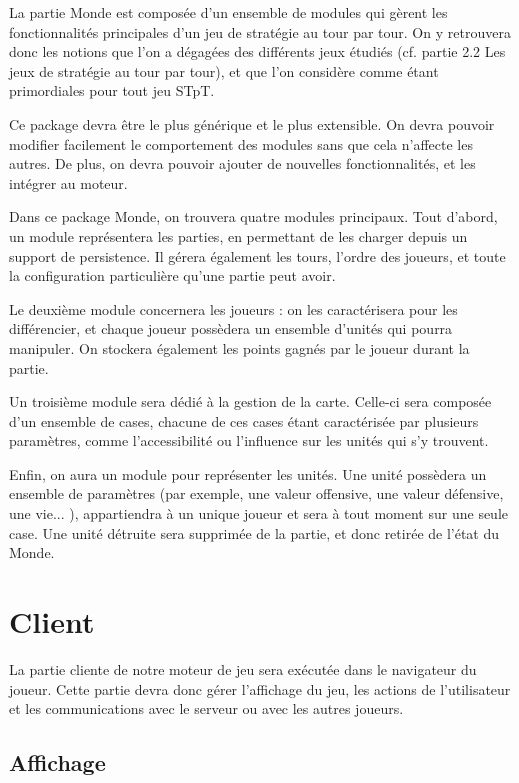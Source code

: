 \documentclass[a4paper,10pt]{report}
\begin{document}
        La partie Monde est composée d'un ensemble de modules qui gèrent les fonctionnalités principales d'un jeu de stratégie au tour par tour. On y retrouvera donc les notions que l'on a dégagées des différents jeux étudiés (cf. partie 2.2 Les jeux de stratégie au tour par tour), et que l'on considère comme étant primordiales pour tout jeu STpT. 
        
        Ce package devra être le plus générique et le plus extensible. On devra pouvoir modifier facilement le comportement des modules sans que cela n'affecte les autres. De plus, on devra pouvoir ajouter de nouvelles fonctionnalités, et les intégrer au moteur.

        Dans ce package Monde, on trouvera quatre modules principaux. Tout d'abord, un module représentera les parties, en permettant de les charger depuis un support de persistence. Il gérera également les tours, l'ordre des joueurs, et toute la configuration particulière qu'une partie peut avoir. 

        Le deuxième module concernera les joueurs : on les caractérisera pour les différencier, et chaque joueur possèdera un ensemble d'unités qui pourra manipuler. On stockera également les points gagnés par le joueur durant la partie. 

        Un troisième module sera dédié à la gestion de la carte. Celle-ci sera composée d'un ensemble de cases, chacune de ces cases étant caractérisée par plusieurs paramètres, comme l'accessibilité ou l'influence sur les unités qui s'y trouvent. 

        Enfin, on aura un module pour représenter les unités. Une unité possèdera un ensemble de paramètres (par exemple, une valeur offensive, une valeur défensive, une vie... ), appartiendra à un unique joueur et sera à tout moment sur une seule case. Une unité détruite sera supprimée de la partie, et donc retirée de l'état du Monde. 


    \section{Client}

      La partie cliente de notre moteur de jeu sera exécutée dans le navigateur du joueur. Cette partie devra donc gérer l'affichage du jeu, les actions de l'utilisateur et les communications avec le serveur ou avec les autres joueurs. 

      \subsection{Affichage}
\end{document}
